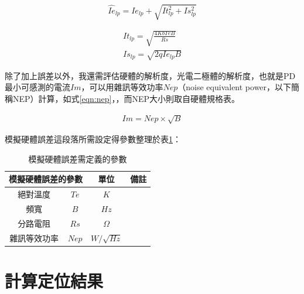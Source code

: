    \begin{equation}
    \label{eqn:noise}
        \hat{Ie}_{lp}=Ie_{lp}+\sqrt{It_{lp}^2+Is_{lp}^2} 
    \end{equation}


    \begin{gather}
        \label{eqn:thermal_noise}
        It_{lp}=\sqrt{\frac{4 Kb Te B}{Rs}}\\
        \label{eqn:shot_noise}
        Is_{lp}=\sqrt{2qIe_{lp}B}
    \end{gather}

    除了加上誤差以外，我還需評估硬體的解析度，光電二極體的解析度，也就是PD最小可感測的電流$Im$，可以用雜訊等效功率$Nep$（noise equivalent power，以下簡稱NEP）計算，如式\ref{eqn:nep}，，而NEP大小則取自硬體規格表。

    \begin{gather}
        \label{eqn:nep}
        Im = Nep\times \sqrt{B}
    \end{gather}

    模擬硬體誤差這段落所需設定得參數整理於表\ref{tab:para_error}：

    \begin{table}[h]
        \renewcommand{\arraystretch}{1.3}
        \setlength{\arrayrulewidth}{0.15mm}
        \setlength{\doublerulesep}{0.12mm}
        \caption{模擬硬體誤差需定義的參數}
        \label{tab:para_error}
        \centering
        \begin{tabular}{|cc|c|c|}
        \hline
        \multicolumn{2}{|c|}{\textbf{模擬硬體誤差的參數}}  &\textbf{單位}  &  \textbf{備註}   \\
        \hline
        絕對溫度 &$Te$ & $K$ &  \\
        頻寬 &$B$ & $Hz$ &  \\
        分路電阻 &$Rs$ & $\Omega$ &  \\
        雜訊等效功率 &$Nep$ & $W/\sqrt{Hz}$ &  \\
        \hline
        \end{tabular}
    \end{table}













\section{計算定位結果}
\label{chp:simulate_result}



